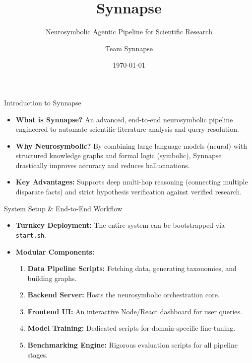 \documentclass{beamer}
\title{Synnapse}
\subtitle{Neurosymbolic Agentic Pipeline for Scientific Research}
\author{Team Synnapse}
\date{\today}
\begin{document}
\begin{frame}
    \titlepage
\end{frame}

\begin{frame}{Introduction to Synnapse}
    \begin{itemize}
        \item \textbf{What is Synnapse?} An advanced, end-to-end neurosymbolic pipeline engineered to automate scientific literature analysis and query resolution.
        \item \textbf{Why Neurosymbolic?} By combining large language models (neural) with structured knowledge graphs and formal logic (symbolic), Synnapse drastically improves accuracy and reduces hallucinations.
        \item \textbf{Key Advantages:} Supports deep multi-hop reasoning (connecting multiple disparate facts) and strict hypothesis verification against verified research.
    \end{itemize}
\end{frame}

\begin{frame}{System Setup & End-to-End Workflow}
    \begin{itemize}
        \item \textbf{Turnkey Deployment:} The entire system can be bootstrapped via \texttt{start.sh}.
        \item \textbf{Modular Components:}
        \begin{enumerate}
            \item \textbf{Data Pipeline Scripts:} Fetching data, generating taxonomies, and building graphs.
            \item \textbf{Backend Server:} Hosts the neurosymbolic orchestration core.
            \item \textbf{Frontend UI:} An interactive Node/React dashboard for user queries.
            \item \textbf{Model Training:} Dedicated scripts for domain-specific fine-tuning.
            \item \textbf{Benchmarking Engine:} Rigorous evaluation scripts for all pipeline stages.
        \end{enumerate}
    \end{itemize}
\end{frame}
\end{document}
